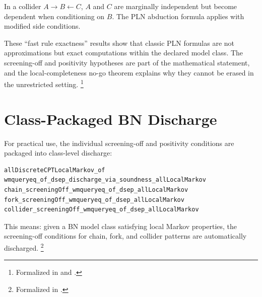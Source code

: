 \documentclass[11pt,openany]{report}
\begin{document}
\begin{theorem}
In a collider $A \to B \leftarrow C$, $A$ and $C$ are marginally
independent but become dependent when conditioning on $B$.  The PLN
abduction formula applies with modified side conditions.
\end{theorem}

These ``fast rule exactness'' results show that classic PLN formulas are
not approximations but exact computations within the declared model class.
The screening-off and positivity hypotheses are part of the mathematical
statement, and the local-completeness no-go theorem explains why they
cannot be erased in the unrestricted setting.%
\footnote{Formalized in  and
  .}


\section{Class-Packaged BN Discharge}

For practical use, the individual screening-off and positivity conditions
are packaged into class-level discharge:
\begin{lstlisting}
allDiscreteCPTLocalMarkov_of
wmqueryeq_of_dsep_discharge_via_soundness_allLocalMarkov
chain_screeningOff_wmqueryeq_of_dsep_allLocalMarkov
fork_screeningOff_wmqueryeq_of_dsep_allLocalMarkov
collider_screeningOff_wmqueryeq_of_dsep_allLocalMarkov
\end{lstlisting}

This means: given a BN model class satisfying local Markov properties,
the screening-off conditions for chain, fork, and collider patterns are
automatically discharged.%
\footnote{Formalized in .}
\end{document}
